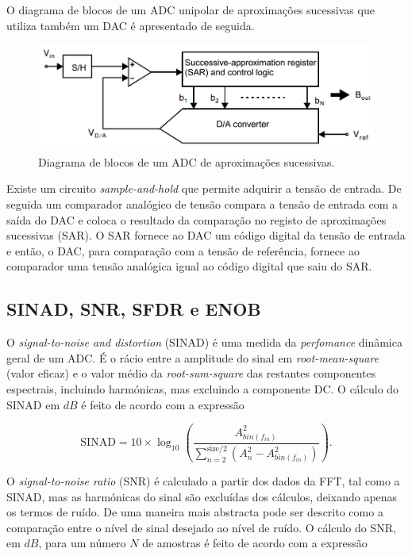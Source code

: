 \documentclass[11pt]{article}
\numberwithin{equation}{section}
\begin{document}
O diagrama de blocos de um ADC unipolar de aproximações sucessivas que utiliza também um DAC é apresentado de seguida.
	
\pagebreak	

\begin{figure}[h]
	\centering
	\includegraphics[keepaspectratio=true, scale=0.30]{./teoricas/SAR_2}
	\caption{Diagrama de blocos de um ADC de aproximações sucessivas.}
	\vspace{-0.8em}
\end{figure}

Existe um circuito \textit{sample-and-hold} que permite adquirir a tensão de entrada. De seguida um comparador analógico de tensão compara a tensão de entrada com a saída do DAC e coloca o resultado da comparação no registo de aproximações sucessivas (SAR). O SAR fornece ao DAC um código digital da tensão de entrada e então, o DAC, para comparação com a tensão de referência, fornece ao comparador uma tensão analógica igual ao código digital que saiu do SAR. 

\subsection{SINAD, SNR, SFDR e ENOB}

O \textit{signal-to-noise and distortion} (SINAD) é uma medida da \textit{perfomance} dinâmica geral de um ADC. É o rácio entre a amplitude do sinal em \textit{root-mean-square} (valor eficaz) e o valor médio da \textit{root-sum-square} das restantes componentes espectrais, incluindo harmónicas, mas excluindo a componente DC. O cálculo do SINAD em $dB$ é feito de acordo com a expressão

\vspace{-3mm}
\begin{equation}
\text{SINAD} = 10\times \log_{10} \left(\frac{A^{2}_{bin(f_{in})}}{\sum_{n=2}^{\text{size}/2}\left(A^{2}_{n} - A^{2}_{bin(f_{in})}\right)}\right).
\label{eq:SINAD}
\end{equation}

\vspace{1mm}
O \textit{signal-to-noise ratio} (SNR) é calculado a partir dos dados da FFT, tal como a SINAD, mas as harmónicas do sinal são excluídas dos cálculos, deixando apenas os termos de ruído. De uma maneira mais abstracta pode ser descrito como a comparação entre o nível de sinal desejado ao nível de ruído. O cálculo do SNR, em $dB$, para um número $N$ de amostras  é feito de acordo com a expressão
\end{document}
